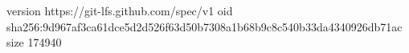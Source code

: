 version https://git-lfs.github.com/spec/v1
oid sha256:9d967af3ca61dce5d2d526f63d50b7308a1b68b9c8c540b33da4340926db71ac
size 174940
